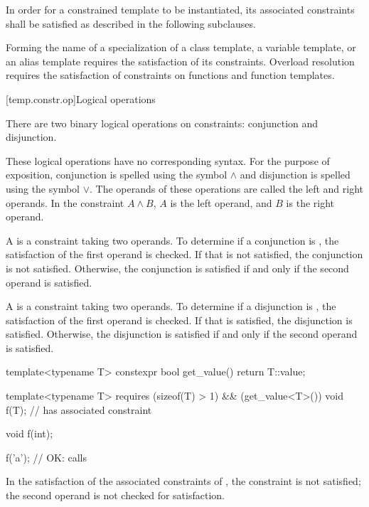 \pnum
In order for a constrained template to be instantiated,
its associated constraints
shall be satisfied as described in the following subclauses.
\begin{note}
Forming the name of a specialization of
a class template,
a variable template, or
an alias template
requires the satisfaction of its constraints.
Overload resolution
requires the satisfaction of constraints
on functions and function templates.
\end{note}

[temp.constr.op]{Logical operations}

\pnum
There are two binary logical operations on constraints: conjunction
and disjunction.
\begin{note}
These logical operations have no corresponding \Cpp{} syntax.
For the purpose of exposition, conjunction is spelled
using the symbol $\land$ and disjunction is spelled using the
symbol $\lor$.
The operands of these operations are called the left
and right operands. In the constraint $A \land B$,
$A$ is the left operand, and $B$ is the right operand.
\end{note}

\pnum
A  is a constraint taking two
operands.
To determine if a conjunction is
,
the satisfaction of
the first operand is checked.
If that is not satisfied, the conjunction is not satisfied.
Otherwise, the conjunction is satisfied if and only if the second
operand is satisfied.

\pnum
A  is a constraint taking two
operands.
%
To determine if a disjunction is
,
the satisfaction of
the first operand is checked.
If that is satisfied, the disjunction is satisfied.
Otherwise, the disjunction is satisfied if and only if the second
operand is satisfied.

\pnum
\begin{example}
\begin{codeblock}
template<typename T>
  constexpr bool get_value() { return T::value; }

template<typename T>
  requires (sizeof(T) > 1) && (get_value<T>())
    void f(T);      // has associated constraint 

void f(int);

f('a'); // OK: calls 
\end{codeblock}
In the satisfaction of the associated constraints
of , the constraint  is not satisfied;
the second operand is not checked for satisfaction.
\end{example}

